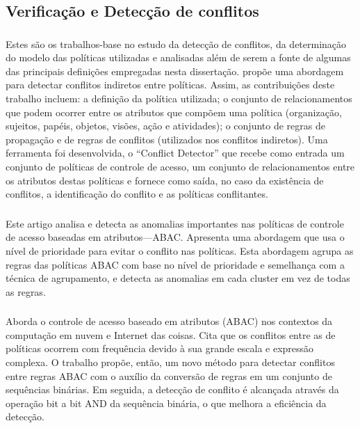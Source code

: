 \subsection{Verificação e Detecção de conflitos}\label{sec:deteccao-conflitos}
\subsubsection{ }
Estes são os trabalhos-base no estudo da detecção de conflitos, da determinação do modelo das políticas utilizadas e analisadas além de serem a fonte de algumas das principais definições empregadas nesta dissertação.  propõe uma abordagem para detectar conflitos indiretos entre políticas. Assim, as contribuições deste trabalho incluem: a definição da política utilizada; o conjunto de relacionamentos que podem ocorrer entre os atributos que compõem uma política (organização, sujeitos, papéis, objetos, visões, ação e atividades); o conjunto de regras de propagação e de regras de conflitos (utilizados nos conflitos indiretos). Uma ferramenta foi desenvolvida, o  ``Conflict Detector'' que recebe como entrada um conjunto de políticas de controle de acesso, um conjunto de relacionamentos entre os atributos destas políticas e fornece como saída, no caso da existência de conflitos, a identificação do conflito e as políticas conflitantes.

\subsubsection{ }
Este artigo analisa e detecta as anomalias importantes nas políticas de controle de acesso baseadas em atributos---ABAC. Apresenta uma abordagem que usa o nível de prioridade para evitar o conflito nas políticas. Esta abordagem agrupa as regras das políticas ABAC com base no nível de prioridade e semelhança com a técnica de agrupamento, e detecta as anomalias em cada cluster em vez de todas as regras.

\subsubsection{ }
Aborda o controle de acesso baseado em atributos (ABAC) nos contextos da computação em nuvem e Internet das coisas. Cita que os conflitos entre as de políticas ocorrem com frequência devido à sua grande escala e expressão complexa. O trabalho propõe, então, um novo método para detectar conflitos entre regras ABAC com o auxílio da conversão de regras em um conjunto de sequências binárias. Em seguida, a detecção de conflito é alcançada através da operação bit a bit AND da sequência binária, o que melhora a eficiência da detecção.

